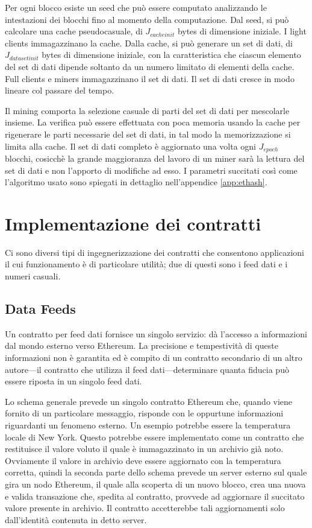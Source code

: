 \documentclass[9pt,oneside]{amsart}
\begin{document}
\begin{multicols}{2}
Per ogni blocco esiste un seed che può essere computato analizzando le intestazioni dei blocchi fino al momento della computazione. Dal seed, si può calcolare una cache pseudocasuale, di $J_{cacheinit}$ bytes di dimensione iniziale. I light clients immagazzinano la cache. Dalla cache, si può generare un set di dati, di $J_{datasetinit}$ bytes di dimensione iniziale, con la caratteristica che ciascun elemento del set di dati dipende soltanto da un numero limitato di elementi della cache. Full clients e miners immagazzinano il set di dati. Il set di dati cresce in modo lineare col passare del tempo.

Il mining comporta la selezione casuale di parti del set di dati per mescolarle insieme. La verifica può essere effettuata con poca memoria usando la cache per rigenerare le parti necessarie del set di dati, in tal modo la memorizzazione si limita alla cache. Il set di dati completo è aggiornato una volta ogni $J_{epoch}$ blocchi, cosicchè la grande maggioranza del lavoro di un miner sarà la lettura del set di dati e non l'apporto di modifiche ad esso. I parametri succitati così come l'algoritmo usato sono spiegati in dettaglio nell'appendice \ref{app:ethash}.

\section{Implementazione dei contratti}

Ci sono diversi tipi di ingegnerizzazione dei contratti che consentono applicazioni il cui funzionamento è di particolare utilità; due di questi sono i feed dati e i numeri casuali. 

\subsection{Data Feeds}
Un contratto per feed dati fornisce un singolo servizio: dà l'accesso a informazioni dal mondo esterno verso Ethereum. La precisione e tempestività di queste informazioni non è garantita ed è compito di un contratto secondario di un altro autore---il contratto che utilizza il feed dati---determinare quanta fiducia può essere riposta in un singolo feed dati.

Lo schema generale prevede un singolo contratto Ethereum che, quando viene fornito di un particolare  messaggio, risponde con le oppurtune informazioni riguardanti un fenomeno esterno. Un esempio potrebbe essere la temperatura locale di New York. Questo potrebbe essere implementato come un contratto che restituisce il valore voluto il quale è immagazzinato in un archivio già noto. Ovviamente il valore in archivio deve essere aggiornato con la temperatura corretta, quindi la seconda parte dello schema prevede un server esterno sul quale gira un nodo Ethereum, il quale alla scoperta di un nuovo blocco, crea una nuova e valida transazione che, spedita al contratto, provvede ad aggiornare il succitato valore presente in archivio. Il contratto accetterebbe tali aggiornamenti solo dall'identità contenuta in detto server.


\end{multicols}
\end{document}
